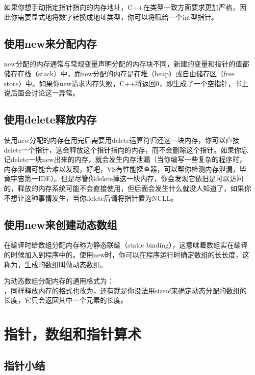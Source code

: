 如果你想手动指定指针指向的内存地址，C++在类型一致方面要求更加严格，因此你需要显式地将数字转换成地址类型，你可以将赋给一个int型指针。

\subsection{使用new来分配内存}

new分配的内存通常与常规变量声明分配的内存块不同，新建的变量和指针的值都储存在栈（stack）中，而new分配的内存是在堆（heap）或自由储存区（free store）中。如果你new请求内存失败，C++将返回0，即生成了一个空指针，书上说后面会讨论这一异常。

\subsection{使用delete释放内存}

使用new分配的内存在用完后需要用delete运算符归还这一块内存，你可以直接delete一个指针，这会释放这个指针指向的内存，而不会删除这个指针。如果你忘记delete一块new出来的内存，就会发生内存泄漏（当你编写一些复杂的程序时，内存泄漏可能会难以发现，好吧，VS有性能探查器，可以帮你检测内存泄漏，毕竟宇宙第一IDE）。但是尽管你delete掉这一块内存，你会发现它依旧是可以访问的，释放的内存系统可能不会直接使用，但后面会发生什么就没人知道了，如果你不想让这种事情发生，当你delete后请将指针置为NULL。

\subsection{使用new来创建动态数组}

在编译时给数组分配内存称为静态联编（static binding），这意味着数组实在编译的时候加入到程序中的。使用new时，你可以在程序运行时确定数组的长长度，这称为，生成的数组叫做动态数组。

为动态数组分配内存的通用格式为：\\ ，同样释放内存的格式也改为，还有就是你没法用sizeof来确定动态分配的数组的长度，它只会返回其中一个元素的长度。

\section{指针，数组和指针算术}

\addtocounter{subsection}{1}

\subsection{指针小结}

